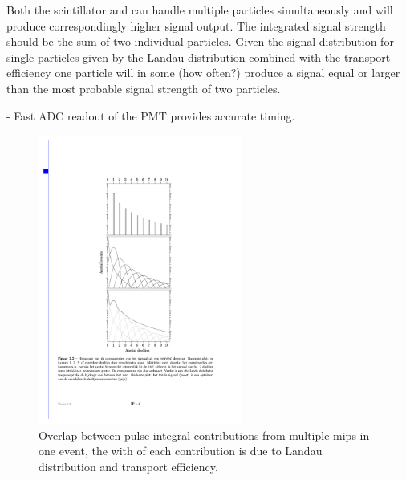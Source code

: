 Both the scintillator and \pmt can handle multiple particles simultaneously and will produce correspondingly higher signal output. The integrated signal strength should be the sum of two individual particles. Given the signal distribution for single particles given by the Landau distribution combined with the transport efficiency one particle will in some (how often?) produce a signal equal or larger than the most probable signal strength of two particles.

- Fast ADC readout of the PMT provides accurate timing.


\begin{figure}
    \centering
    \includegraphics[width=0.6\textwidth]
                    {plots/experiment/ph_histogram_contrib}
    \caption{Overlap between pulse integral contributions from multiple mips in one event, the with of each contribution is due to Landau distribution and transport efficiency.}
    \label{fig:ph_histogram_contrib}
\end{figure}


